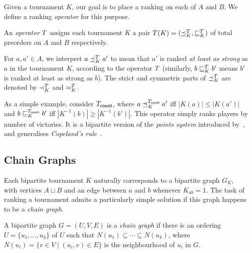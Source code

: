 Given a tournament $K$, our goal is to place a ranking on each of $A$ and $B$. We
define a ranking \emph{operator} for this purpose.

\begin{definition}%

    An \emph{operator} $T$ assigns each tournament $K$ a pair $T(K) =
    ({\preceq_K^T}, {\sqsubseteq_K^T})$ of total preorders on $A$ and $B$
    respectively.\footnotemark{}

\end{definition}


For $a, a' \in A$, we interpret $a \preceq_K^T a'$ to mean that $a'$ is ranked
\emph{at least as strong} as $a$ in the tournament $K$, according to the
operator $T$ (similarly, $b \sqsubseteq_K^T b'$ means $b'$ is ranked at least as
strong as $b$). The strict and symmetric parts of ${\preceq_K^T}$ are denoted
by ${\prec_K^T}$ and ${\approx_K^T}$.

As a simple example, consider ${T_{\mathsf{count}}}$, where $a \preceq_K^{T_{\mathsf{count}}} a'$ iff
$|K(a)| \le |K(a')|$ and $b \sqsubseteq_K^{T_{\mathsf{count}}} b'$ iff $|K^{-1}(b)| \ge
|K^{-1}(b')|$. This operator simply ranks players by number of victories. It is
a bipartite version of the \emph{points system} introduced
by~\textcite{rubinstein1980ranking}, and generalises \emph{Copeland's
rule}~\cite{brandt2016a}.

\subsection{Chain Graphs}

Each bipartite tournament $K$ naturally corresponds to a bipartite graph $G_K$,
with vertices $A \sqcup B$ and an edge between $a$ and $b$ whenever $K_{ab} =
1$.\footnotemark{} The task of ranking a tournament admits a particularly
simple solution if this graph happens to be a \emph{chain graph}.


\begin{definition}
\label{tourn_def_chain_graph}

    A bipartite graph $G = (U, V, E)$ is a \emph{chain graph} if there is an
    ordering $U = \{u_1,\ldots,u_k\}$ of $U$ such that $N(u_1) \subseteq \cdots
    \subseteq N(u_k)$, where $N(u_i) = \{v \in V \mid (u_i, v) \in E\}$ is the
    neighbourhood of $u_i$ in $G$.

\end{definition}

